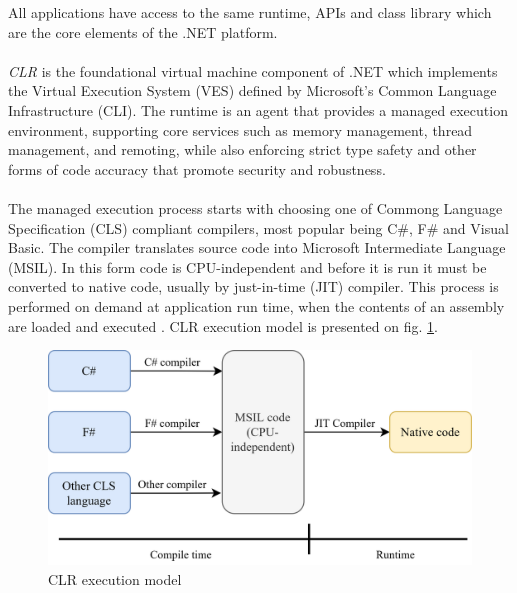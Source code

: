 All applications have access to the same runtime, APIs and class library which are the core elements of the .NET platform.
\\ \\ 
\emph{CLR} is the foundational virtual machine component of .NET which implements the Virtual Execution System (VES) defined by Microsoft's Common Language Infrastructure (CLI). The runtime is an agent that provides a managed execution environment, supporting core services such as memory management, thread management, and remoting, while also enforcing strict type safety and other forms of code accuracy that promote security and robustness. \cite{IntroductionToNet}
\\ \\ 
The managed execution process starts with choosing one of Commong Language Specification (CLS) compliant compilers, most popular being C\#, F\# and Visual Basic. The compiler translates source code into Microsoft Intermediate Language (MSIL). In this form code is CPU-independent and before it is run it must be converted to native code, usually by just-in-time (JIT) compiler. This process is performed on demand at application run time, when the contents of an assembly are loaded and executed \cite{ManagedExecution}.
CLR execution model is presented on fig. \ref{fig:clr}.

\begin{figure}[htb]
	\centering
		\includegraphics[scale=1.0]{figures02/clr.png}
	\caption{CLR execution model}
	\label{fig:clr}
\end{figure}


